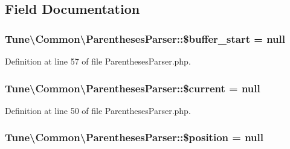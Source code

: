 \subsection{Field Documentation}
\hypertarget{classTune_1_1Common_1_1ParenthesesParser_a1b10c2d81217de8093d7bbff7210e9a2}{
\subsubsection[{\$buffer\-\_\-start}]{\setlength{\rightskip}{0pt plus 5cm}Tune\textbackslash{}\-Common\textbackslash{}\-Parentheses\-Parser\-::\$buffer\-\_\-start = null\hspace{0.3cm}{\ttfamily [protected]}}}\label{classTune_1_1Common_1_1ParenthesesParser_a1b10c2d81217de8093d7bbff7210e9a2}


Definition at line 57 of file Parentheses\-Parser.\-php.

\hypertarget{classTune_1_1Common_1_1ParenthesesParser_a1dbf6b4adbe448a5eb03ce648654138a}{
\subsubsection[{\$current}]{\setlength{\rightskip}{0pt plus 5cm}Tune\textbackslash{}\-Common\textbackslash{}\-Parentheses\-Parser\-::\$current = null\hspace{0.3cm}{\ttfamily [protected]}}}\label{classTune_1_1Common_1_1ParenthesesParser_a1dbf6b4adbe448a5eb03ce648654138a}


Definition at line 50 of file Parentheses\-Parser.\-php.

\hypertarget{classTune_1_1Common_1_1ParenthesesParser_a306af4f72762108e5a6d13357e6339d0}{
\subsubsection[{\$position}]{\setlength{\rightskip}{0pt plus 5cm}Tune\textbackslash{}\-Common\textbackslash{}\-Parentheses\-Parser\-::\$position = null\hspace{0.3cm}{\ttfamily [protected]}}}\label{classTune_1_1Common_1_1ParenthesesParser_a306af4f72762108e5a6d13357e6339d0}



